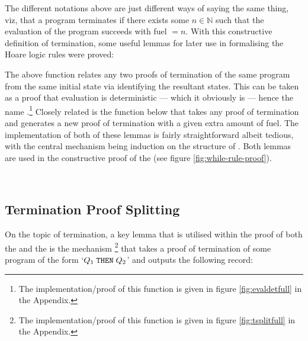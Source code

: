 \documentclass[oneside,12pt]{article}
\newcommand{\impcode}[1]{\textsc{\texttt{#1}}}
\begin{document}
The different notations above are just different ways of saying the same thing, viz, that a program terminates if there exists some $n \in \mathbb{N}$ such that the evaluation of the program succeeds with fuel $= n$. With this constructive definition of termination, some useful lemmas for later use in formalising the Hoare logic rules were proved:

\hspace{1em}

{\small }

The above function relates any two proofs of termination of the same program from the same initial state via identifying the resultant states. This can be taken as a proof that evaluation is deterministic --- which it obviously is --- hence the name .\footnote{The implementation/proof of this function is given in figure \ref{fig:evaldetfull} in the Appendix.} Closely related is the  function below that takes any proof of termination and generates a new proof of termination with a given extra amount of fuel. The implementation of both of these lemmas is fairly straightforward albeit tedious, with the central mechanism being induction on the structure of . Both lemmas are used in the constructive proof of the  (see figure \ref{fig:while-rule-proof}).

{\,
\begin{minipage}{0.9\textwidth}
{}
\end{minipage}
}






\subsection{Termination Proof Splitting}


On the topic of termination, a key lemma that is utilised within the proof of both the  and the  is the mechanism \mbox{}\footnote{The implementation/proof of this function is given in figure \ref{fig:tsplitfull} in the Appendix.} that takes a proof of termination of some program of the form `$Q_1 \; \AgdaFunction{\impcode{THEN}} \; Q_2$' and outputs the following \mbox{} record:


{\centering }
\end{document}
